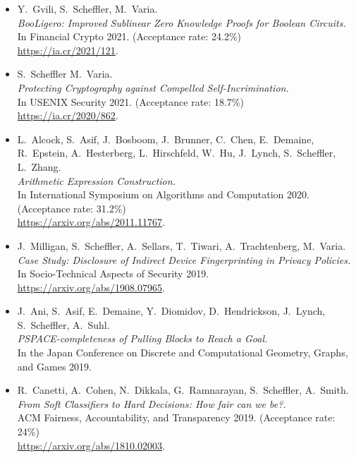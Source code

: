 \documentclass{res}
\begin{document}
\begin{resume}
\begin{itemize}
\item[\booligero] Y.~Gvili, S.~Scheffler, M.~Varia. \\
\emph{BooLigero: Improved Sublinear Zero Knowledge Proofs for Boolean Circuits.} \\
In Financial Crypto 2021.  (Acceptance rate: 24.2\%) \\
\url{https://ia.cr/2021/121}.

\item[\foregoneconclusion] S.~Scheffler M.~Varia. \\
\emph{Protecting Cryptography against Compelled Self-Incrimination.} \\
In USENIX Security 2021. (Acceptance rate: 18.7\%)\\
\url{https://ia.cr/2020/862}.

\item[\AEC] L.~Alcock, S.~Asif, J.~Bosboom, J.~Brunner, C.~Chen, E.~Demaine, R.~Epstein,
A.~Hesterberg, L.~Hirschfeld, W.~Hu, J.~Lynch, S.~Scheffler, L.~Zhang. \\
\emph{Arithmetic Expression Construction.} \\
In International Symposium on Algorithms and Computation 2020. (Acceptance rate: 31.2\%) \\
\url{https://arxiv.org/abs/2011.11767}.

\item[\devicefingerprinting] J.~Milligan, S.~Scheffler, A.~Sellars, T.~Tiwari, A.~Trachtenberg, M.~Varia.  \\
\emph{Case Study: Disclosure of Indirect Device Fingerprinting in Privacy Policies.} \\
In Socio-Technical Aspects of Security 2019. \\
\url{https://arxiv.org/abs/1908.07965}.

\item[\pullingblocks] J.~Ani, S.~Asif, E.~Demaine, Y.~Diomidov, D.~Hendrickson, J.~Lynch, S.~Scheffler, A.~Suhl. \\
\emph{PSPACE-completeness of Pulling Blocks to Reach a Goal.}  \\
In the Japan Conference on Discrete and Computational Geometry, Graphs, and Games 2019.

\item[\fairsibility] R.~Canetti, A.~Cohen, N.~Dikkala, G.~Ramnarayan, S.~Scheffler, A.~Smith. \\
\emph{From Soft Classifiers to Hard Decisions: How fair can we be?.} \\
ACM Fairness, Accountability, and Transparency 2019. (Acceptance rate: 24\%) \\
\url{https://arxiv.org/abs/1810.02003}.


\end{itemize}
\end{resume}
\end{document}
